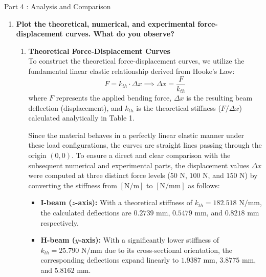 \documentclass[12pt, a4paper]{article}
\begin{document}
\begin{tcolorbox}[
    colback=MainBlue!5,
    colframe=MainBlue,
    arc=3mm,
    boxrule=1pt,
    halign=center,
    fontupper=\Large\bfseries\color{DarkBlue}
]


\newpage
Part 4 : Analysis and Comparison
\end{tcolorbox}
\vspace{0.3cm}
\begin{enumerate}[label=\textbf{\arabic*.}, leftmargin=*]
    \item \textbf{Plot the theoretical, numerical, and experimental force-displacement curves. What do you observe?} \\
        \begin{enumerate} \item \textbf{Theoretical Force-Displacement Curves} \\
        
\noindent To construct the theoretical force-displacement curves, we utilize the fundamental linear elastic relationship derived from Hooke's Law:
\begin{equation}
    F = k_{th} \cdot \Delta x \implies \Delta x = \frac{F}{k_{th}}
\end{equation}
where $F$ represents the applied bending force, $\Delta x$ is the resulting beam deflection (displacement), and $k_{th}$ is the theoretical stiffness ($F/\Delta x$) calculated analytically in Table 1. 

\noindent Since the material behaves in a perfectly linear elastic manner under these load configurations, the curves are straight lines passing through the origin $(0,0)$. To ensure a direct and clear comparison with the subsequent numerical and experimental parts, the displacement values $\Delta x$ were computed at three distinct force levels ($50\text{ N}$, $100\text{ N}$, and $150\text{ N}$) by converting the stiffness from $[\text{N/m}]$ to $[\text{N/mm}]$ as follows:
\begin{itemize}[noitemsep, topsep=3pt]
    \item \textbf{I-beam ($z$-axis):} With a theoretical stiffness of $k_{th} = 182.518\text{ N/mm}$, the calculated deflections are $0.2739\text{ mm}$, $0.5479\text{ mm}$, and $0.8218\text{ mm}$ respectively.
    \item \textbf{H-beam ($y$-axis):} With a significantly lower stiffness of $k_{th} = 25.790\text{ N/mm}$ due to its cross-sectional orientation, the corresponding deflections expand linearly to $1.9387\text{ mm}$, $3.8775\text{ mm}$, and $5.8162\text{ mm}$.
\end{itemize}


\end{enumerate}
\end{enumerate}
\end{document}
